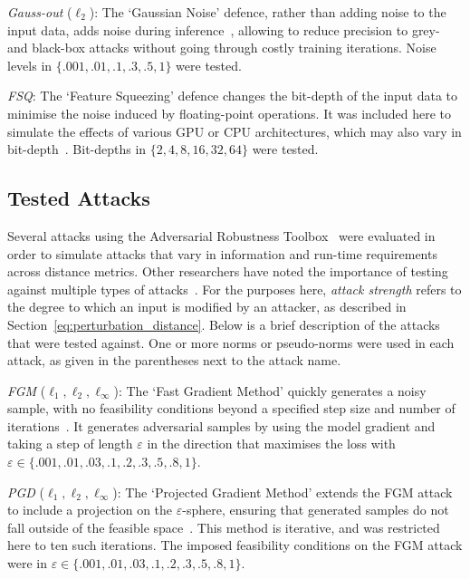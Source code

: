 \textit{Gauss-out} ($\ell_2$): The `Gaussian Noise' defence, rather than adding noise to the input data, adds noise during inference~\cite{gauss_out}, allowing to reduce precision to grey- and black-box attacks without going through costly training iterations. Noise levels in $\{.001, .01, .1, .3, .5, 1\}$ were tested.


\textit{FSQ}: The `Feature Squeezing' defence changes the bit-depth of the input data to minimise the noise induced by floating-point operations. It was included here to simulate the effects of various GPU or CPU architectures, which may also vary in bit-depth~\cite{feature_squeezing}. Bit-depths in $\{2, 4, 8, 16, 32, 64\}$ were tested.



\subsection{Tested Attacks}
\label{attacks}

Several attacks using the Adversarial Robustness Toolbox~\cite{art2018} were evaluated in order to simulate attacks that vary in information and run-time requirements across distance metrics. Other researchers have noted the importance of testing against multiple types of attacks~\cite{carlini_towards_2017}. For the purposes here, \textit{attack strength} refers to the degree to which an input is modified by an attacker, as described in Section~\ref{eq:perturbation_distance}. Below is a brief description of the attacks that were tested against. One or more norms or pseudo-norms were used in each attack, as given in the parentheses next to the attack name.


\textit{FGM} ($\ell_1, \ell_2, \ell_{\infty}$): The `Fast Gradient Method' quickly generates a noisy sample, with no feasibility conditions beyond a specified step size and number of iterations~\cite{fgm}. It generates adversarial samples by using the model gradient and taking a step of length $\varepsilon$ in the direction that maximises the loss with $\varepsilon \in \{.001,.01,.03,.1,.2,.3,.5,.8,1\}$.


\textit{PGD}  ($\ell_1, \ell_2, \ell_{\infty}$): The `Projected Gradient Method' extends the FGM attack to include a projection on the $\varepsilon$-sphere, ensuring that generated samples do not fall outside of the feasible space~\cite{madry2017towards}. This method is iterative, and was restricted here to ten such iterations. The imposed feasibility conditions on the FGM attack were in $\varepsilon \in \{.001,.01,.03,.1,.2,.3,.5,.8,1\}$.


